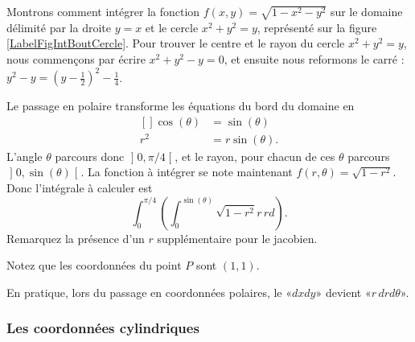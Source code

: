 \begin{example}     \label{ExpmfDtAtV}
    Montrons comment intégrer la fonction $f(x,y)=\sqrt{1-x^2-y^2}$ sur le domaine délimité par la droite $y=x$ et le cercle $x^2+y^2=y$, représenté sur la figure \ref{LabelFigIntBoutCercle}. Pour trouver le centre et le rayon du cercle $x^2+y^2=y$, nous commençons par écrire $x^2+y^2-y=0$, et ensuite nous reformons le carré : $y^2-y=(y-\frac{ 1 }{2})^2-\frac{1}{ 4 }$.
    \newcommand{\CaptionFigIntBoutCercle}{Passage en polaire pour intégrer sur un morceau de cercle.}
    
    Le passage en polaire transforme les équations du bord du domaine en
    \begin{equation}
        \begin{aligned}[]
            \cos(\theta)&=\sin(\theta)\\
            r^2&=r\sin(\theta).
        \end{aligned}
    \end{equation}
    L'angle $\theta$ parcours donc $\mathopen] 0 , \pi/4 \mathclose[$, et le rayon, pour chacun de ces $\theta$ parcours $\mathopen] 0 , \sin(\theta) \mathclose[$. La fonction à intégrer se note maintenant $f(r,\theta)=\sqrt{1-r^2}$. Donc l'intégrale à calculer est
    \begin{equation}		\label{PgOMRapIntMultFubiniBoutCercle}
        \int_{0}^{\pi/4}\left( \int_0^{\sin(\theta)}\sqrt{1-r^2}r\,rd \right).
    \end{equation}
    Remarquez la présence d'un $r$ supplémentaire pour le jacobien.

    Notez que les coordonnées du point $P$ sont $(1,1)$.
\end{example}

En pratique, lors du passage en coordonnées polaires, le «$dxdy$» devient «$r\,drd\theta$».

\subsubsection{Les coordonnées cylindriques}

